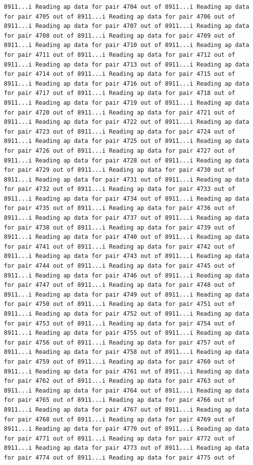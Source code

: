 \documentclass[
]{article}
\begin{document}
\begin{verbatim}
8911...i Reading ap data for pair 4704 out of 8911...i Reading ap data for pair 4705 out of 8911...i Reading ap data for pair 4706 out of 8911...i Reading ap data for pair 4707 out of 8911...i Reading ap data for pair 4708 out of 8911...i Reading ap data for pair 4709 out of 8911...i Reading ap data for pair 4710 out of 8911...i Reading ap data for pair 4711 out of 8911...i Reading ap data for pair 4712 out of 8911...i Reading ap data for pair 4713 out of 8911...i Reading ap data for pair 4714 out of 8911...i Reading ap data for pair 4715 out of 8911...i Reading ap data for pair 4716 out of 8911...i Reading ap data for pair 4717 out of 8911...i Reading ap data for pair 4718 out of 8911...i Reading ap data for pair 4719 out of 8911...i Reading ap data for pair 4720 out of 8911...i Reading ap data for pair 4721 out of 8911...i Reading ap data for pair 4722 out of 8911...i Reading ap data for pair 4723 out of 8911...i Reading ap data for pair 4724 out of 8911...i Reading ap data for pair 4725 out of 8911...i Reading ap data for pair 4726 out of 8911...i Reading ap data for pair 4727 out of 8911...i Reading ap data for pair 4728 out of 8911...i Reading ap data for pair 4729 out of 8911...i Reading ap data for pair 4730 out of 8911...i Reading ap data for pair 4731 out of 8911...i Reading ap data for pair 4732 out of 8911...i Reading ap data for pair 4733 out of 8911...i Reading ap data for pair 4734 out of 8911...i Reading ap data for pair 4735 out of 8911...i Reading ap data for pair 4736 out of 8911...i Reading ap data for pair 4737 out of 8911...i Reading ap data for pair 4738 out of 8911...i Reading ap data for pair 4739 out of 8911...i Reading ap data for pair 4740 out of 8911...i Reading ap data for pair 4741 out of 8911...i Reading ap data for pair 4742 out of 8911...i Reading ap data for pair 4743 out of 8911...i Reading ap data for pair 4744 out of 8911...i Reading ap data for pair 4745 out of 8911...i Reading ap data for pair 4746 out of 8911...i Reading ap data for pair 4747 out of 8911...i Reading ap data for pair 4748 out of 8911...i Reading ap data for pair 4749 out of 8911...i Reading ap data for pair 4750 out of 8911...i Reading ap data for pair 4751 out of 8911...i Reading ap data for pair 4752 out of 8911...i Reading ap data for pair 4753 out of 8911...i Reading ap data for pair 4754 out of 8911...i Reading ap data for pair 4755 out of 8911...i Reading ap data for pair 4756 out of 8911...i Reading ap data for pair 4757 out of 8911...i Reading ap data for pair 4758 out of 8911...i Reading ap data for pair 4759 out of 8911...i Reading ap data for pair 4760 out of 8911...i Reading ap data for pair 4761 out of 8911...i Reading ap data for pair 4762 out of 8911...i Reading ap data for pair 4763 out of 8911...i Reading ap data for pair 4764 out of 8911...i Reading ap data for pair 4765 out of 8911...i Reading ap data for pair 4766 out of 8911...i Reading ap data for pair 4767 out of 8911...i Reading ap data for pair 4768 out of 8911...i Reading ap data for pair 4769 out of 8911...i Reading ap data for pair 4770 out of 8911...i Reading ap data for pair 4771 out of 8911...i Reading ap data for pair 4772 out of 8911...i Reading ap data for pair 4773 out of 8911...i Reading ap data for pair 4774 out of 8911...i Reading ap data for pair 4775 out of 
\end{verbatim}
\end{document}

